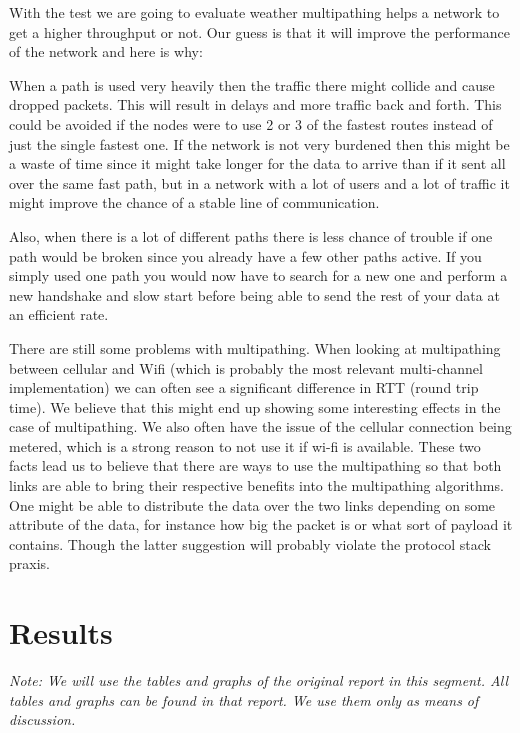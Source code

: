 \documentclass[11pt,twocolumn]{article}
\begin{document}
With the test we are going to evaluate weather multipathing helps a network to get a higher throughput or not. Our guess is that it will improve the performance of the network and here is why:

When a path is used very heavily then the traffic there might collide and cause dropped packets. This will result in delays and more traffic back and forth. This could be avoided if the nodes were to use 2 or 3 of the fastest routes instead of just the single fastest one. If the network is not very burdened then this might be a waste of time since it might take longer for the data to arrive than if it sent all over the same fast path, but in a network with a lot of users and a lot of traffic it might improve the chance of a stable line of communication.

Also, when there is a lot of different paths there is less chance of trouble if one path would be broken since you already have a few other paths active. If you simply used one path you would now have to search for a new one and perform a new handshake and slow start before being able to send the rest of your data at an efficient rate.

There are still some problems with multipathing. When looking at multipathing between cellular and Wifi (which is probably the most relevant multi-channel implementation) we can often see a significant difference in RTT (round trip time). We believe that this might end up showing some interesting effects in the case of multipathing. We also often have the issue of the cellular connection being metered, which is a strong reason to not use it if wi-fi is available. These two facts lead us to believe that there are ways to use the multipathing so that both links are able to bring their respective benefits into the multipathing algorithms. One might be able to distribute the data over the two links depending on some attribute of the data, for instance how big the packet is or what sort of payload it contains. Though the latter suggestion will probably violate the protocol stack praxis.

\section{Results}

\emph{Note: We will use the tables and graphs of the original report\cite{MPTCP-LTE} in this segment. All tables and graphs can be found in that report. We use them only as means of discussion.} \\
\end{document}
